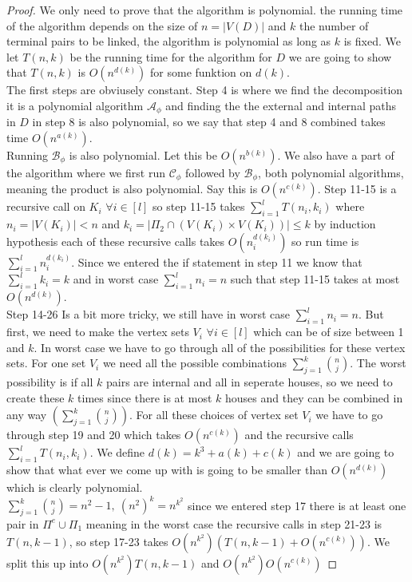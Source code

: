 \begin{proof}
    We only need to prove that the algorithm is polynomial.
    the running time of the algorithm depends on the size of $n=|V(D)|$ and $k$ the number of terminal pairs to be linked, the algorithm is polynomial as long as $k$ is fixed.
    We let $T(n,k)$ be the running time for the algorithm for $D$ we are going to show that $T(n,k)$ is $O(n^{d(k)})$ for some funktion on $d(k)$.\\
    The first steps are obviusely constant. 
    Step 4 is where we find the decomposition it is a polynomial algorithm $\mathcal{A}_\phi$ and finding the the external and internal paths in $D$ in step 8 is also polynomial, so we say that step 4 and 8 combined takes time $O(n^{a(k)})$.\\
    Running $\mathcal{B}_\phi$ is also polynomial. 
    Let this be $O(n^{b(k)})$.
    We also have a part of the algorithm where we first run $\mathcal{C}_\phi$ followed by $\mathcal{B}_\phi$, both polynomial algorithms, meaning the product is also polynomial.
    Say this is $O(n^{c(k)})$.
    Step 11-15 is a recursive call on $K_i$ $\forall i\in[l]$
    so step 11-15 takes $\sum_{i=1}^lT(n_i,k_i)$ where $n_i=|V(K_i)|<n$ and $k_i=|\Pi_2\cap (V(K_i)\times V(K_i))|\leq k$ by induction hypothesis each of these recursive calls takes $O(n_i^{d(k_i)})$ so run time is $\sum_{i=1}^ln_i^{d(k_i)}$.
    Since we entered the if statement in step 11 we know that $\sum_{i=1}^lk_i=k$ and in worst case $\sum_{i=1}^ln_i=n$ such that step 11-15 takes at most $O(n^{d(k)})$.\\
    Step 14-26 Is a bit more tricky, we still have in worst case $\sum_{i=1}^ln_i=n$. 
    But first, we need to make the vertex sets $V_i$ $\forall i\in [l]$ which can be of size between 1 and $k$. 
    In worst case we have to go through all of the possibilities for these vertex sets.
    For one set $V_i$ we need all the possible combinations $\sum_{j=1}^k{{n}\choose{j}}$. 
    The worst possibility is if all $k$ pairs are internal and all in seperate houses, so we need to create these $k$ times since there is at most $k$ houses and they can be combined in any way $\left(\sum_{j=1}^k{{n}\choose{j}}\right)$. 
    For all these choices of vertex set $V_i$ we have to go through step 19 and 20 which takes $O(n^{c(k)})$ and the recursive calls $\sum_{i=1}^l T(n_i,k_i)$.
    We define $d(k)=k^3+a(k)+c(k)$ and we are going to show that what ever we come up with is going to be smaller than $O(n^{d(k)})$ which is clearly polynomial. \\
    $\sum_{j=1}^k{{n}\choose {j}}=n^2-1,\ (n^2)^k=n^{k^2}$ since we entered step 17 there is at least one pair in $\Pi^e\cup \Pi_1$ meaning in the worst case the recursive calls in step 21-23 is $T(n,k-1)$, so step 17-23 takes $O(n^{k^2})(T(n,k-1)+O(n^{c(k)}))$. We split this up into $O(n^{k^2})T(n,k-1)$ and $O(n^{k^2})O(n^{c(k)})$ 

\end{proof}
